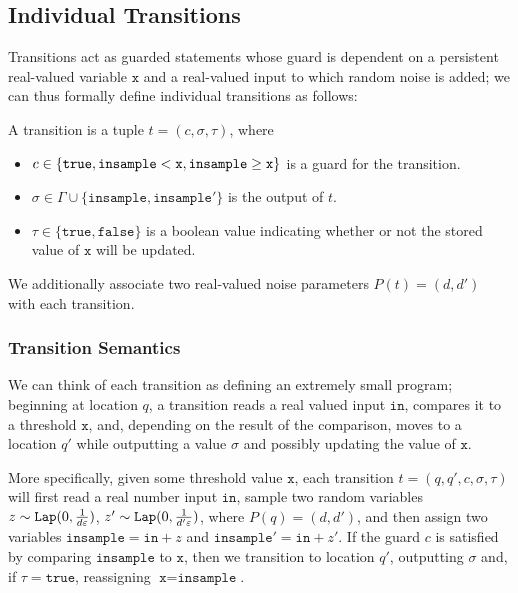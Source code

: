
\subsection{Individual Transitions}

Transitions act as guarded statements whose guard is dependent on a persistent real-valued variable $\texttt{x}$ and a real-valued input to which random noise is added; we can thus formally define individual transitions as follows:

\begin{defn}[Transitions]
    A transition is a tuple $t = (c, \sigma, \tau)$, where \begin{itemize}
        \item $c\in \{\texttt{true}, \lguard[\texttt{x}], \gguard[\texttt{x}]\}$ is a guard for the transition.
        \item $\sigma \in \Gamma\cup\{\texttt{insample}, \texttt{insample}'\}$ is the output of $t$.
        \item $\tau\in\{\texttt{true}, \texttt{false}\}$ is a boolean value indicating whether or not the stored value of $\texttt{x}$ will be updated.
    \end{itemize}
\end{defn}

We additionally associate two real-valued noise parameters $P(t) = (d, d')$ with each transition. 

\subsubsection{Transition Semantics}

We can think of each transition as defining an extremely small program; beginning at location $q$, a transition reads a real valued input $\texttt{in}$, compares it to a threshold $\texttt{x}$, and, depending on the result of the comparison, moves to a location $q'$ while outputting a value $\sigma$ and possibly updating the value of $\texttt{x}$.

More specifically, given some threshold value $\texttt{x}$, each transition $t = (q, q', c, \sigma, \tau)$ will first read a real number input $\texttt{in}$, sample two random variables $z\sim\Lap(0, \frac{1}{d\varepsilon})$, $z'\sim\Lap(0, \frac{1}{d'\varepsilon})$, where $P(q) = (d, d')$, and then assign two variables $\texttt{insample} = \texttt{in} + z$ and $\texttt{insample}' = \texttt{in} + z'$. 
If the guard $c$ is satisfied by comparing $\texttt{insample}$ to $\texttt{x}$, then we transition to location $q'$, outputting $\sigma$ and, if $\tau = \texttt{true}$, reassigning $\texttt{x} = \texttt{insample}$. 

